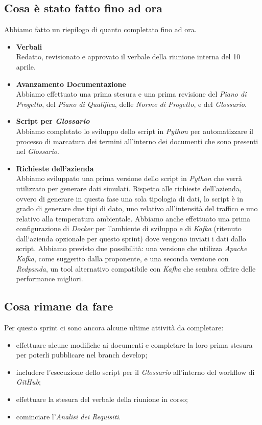 \documentclass[italian,12pt]{article}
\begin{document}
\subsection{Cosa è stato fatto fino ad ora}
Abbiamo fatto un riepilogo di quanto completato fino ad ora.
\begin{itemize}
	\item \textbf{Verbali} \\
	Redatto, revisionato e approvato il verbale della riunione interna del 10 aprile.
	\item \textbf{Avanzamento Documentazione} \\
	Abbiamo effettuato una prima stesura e una prima revisione del \textit{Piano di Progetto}, del \textit{Piano di Qualifica}, delle \textit{Norme di Progetto}, e del \textit{Glossario}.
	\item \textbf{Script per \textit{Glossario}} \\
	Abbiamo completato lo sviluppo dello script in \textit{Python} per automatizzare il processo di marcatura dei termini all'interno dei documenti che sono presenti nel \textit{Glossario}.
	\item \textbf{Richieste dell'azienda} \\
	Abbiamo sviluppato una prima versione dello script in \textit{Python} che verrà utilizzato per generare dati simulati. Rispetto alle richieste dell'azienda, ovvero di generare in questa fase una sola tipologia di dati, lo script è in grado di generare due tipi di dato, uno relativo all'intensità del traffico e uno relativo alla temperatura ambientale. Abbiamo anche effettuato una prima configurazione di \textit{Docker} per l'ambiente di sviluppo e di \textit{Kafka} (ritenuto dall`azienda opzionale per questo sprint) dove vengono inviati i dati dallo script. Abbiamo previsto due possibilità: una versione che utilizza \textit{Apache Kafka}, come suggerito dalla proponente, e una seconda versione con \textit{Redpanda}, un tool alternativo compatibile con \textit{Kafka} che sembra offrire delle performance migliori.
\end{itemize}

\subsection{Cosa rimane da fare}
Per questo sprint ci sono ancora alcune ultime attività da completare:
\begin{itemize}
	\item effettuare alcune modifiche ai documenti e completare la loro prima stesura per poterli pubblicare nel branch develop;
	\item includere l'esecuzione dello script per il \textit{Glossario} all'interno del workflow di \textit{GitHub};
	\item effettuare la stesura del verbale della riunione in corso;
	\item cominciare l'\textit{Analisi dei Requisiti}.
\end{itemize}
\end{document}
